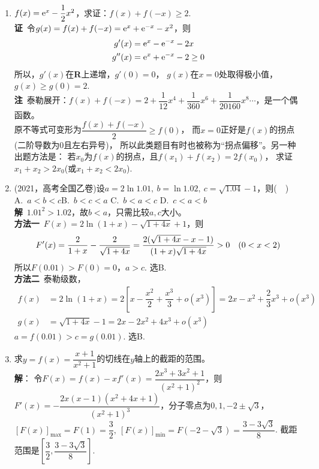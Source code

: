 \begin{enumerate}[label={\textbf{\arabic*.}},leftmargin=
    \inteval{\myenumleftmargin}pt]
\item $ f(x)=\mathrm{e}^x-\dfrac{1}{2}x^2 $，求证：$ f(x)+f(-x)\geq 2 $. \\
\textbf{证}\ 令$ g(x)=f(x)+f(-x)=\mathrm{e}^x+\mathrm{e}^{-x}-x^2 $，则
\begin{align*}
    g'(x) &=\mathrm{e}^x-\mathrm{e}^{-x}-2x \\
    g''(x) &=\mathrm{e}^x+\mathrm{e}^{-x}-2\geq 0 
\end{align*}
所以，$ g'(x) $在\textbf{R}上递增，$ g'(0)=0 $，
$ g(x) $在$ x=0 $处取得极小值，$ g(x)\geq g(0)=2 $. \\
\textbf{注}\ 泰勒展开：$ f(x)+f(-x)=2+\dfrac{1}{12}x^4+\dfrac{1}{360}x^6+
\dfrac{1}{20160}x^8\cdots $，是一个偶函数。\\
原不等式可变形为$ \dfrac{f(x)+f(-x)}{2}\geq f(0) $，
而$ x=0 $正好是$ f(x) $的拐点(二阶导数为0且左右异号)，
所以此类题目有时也被称为“拐点偏移”。另一种出题方法是：
若$ x_0 $为$ f(x) $的拐点，且$ f(x_1)+f(x_2)=2f(x_0) $，
求证$ x_1+x_2>2x_0 $(或$ x_1+x_2< 2x_0 $).

\item (2021，高考全国乙卷)设$a=2\ln1.01,\ b=\ln1.02,\ c=\sqrt{1.04}-1 $，则(\ \ ) \\
A.\ $a<b<c$\q\q B.\ $b<c<a$ \q\q C.\ $b<a<c$ \q\q D.\ $c<a<b$ \\
\textbf{解}\ $1.01^{2}>1.02$，故$b<a$，只需比较$ a,c $大小。\\
\textbf{方法一}\ $ F(x)=2\ln(1+x)-\sqrt{1+4x}+1 $，则
\begin{gather*}
    F'(x)=\dfrac{2}{1+x}-\dfrac{2}{\sqrt{1+4x}}=
    \dfrac{2(\sqrt{1+4x}-x-1)}{(1+x)\sqrt{1+4x}}>0 \quad (0<x<2)
\end{gather*}
所以$ F(0.01)>F(0)=0 $，$ a>c $. 选B. \\
\textbf{方法二}\ 泰勒级数，
\begin{align*}
    f(x) &=2\ln(1+x)=2\left[x-\dfrac{x^{2}}{2}+\dfrac{x^3}{3}+
    o\left(x^{3}\right) \right]=2x-x^2+\dfrac{2}{3}x^3+o(x^3) \\
    g(x) &=\sqrt{1+4x}-1=2x-2x^2+4x^3+o(x^3)
\end{align*}
$ a=f(0.01)>c=g(0.01) $. 选B.

\item 求$ y=f(x)=\dfrac{x+1}{x^2+1} $的切线在$ y $轴上的截距的范围。
\ifteach \\ \textbf{解}：
令$ F(x)=f(x)-xf'(x)=\dfrac{2x^3+3x^2+1}{(x^2+1)^2} $，则
$ F'(x)=-\dfrac{2x(x-1)(x^2+4x+1)}{(x^2+1)^3} $，分子零点为$ 0, 1,
-2\pm \sqrt{3} $，$ [F(x)]_{\max}=F(1)=\dfrac{3}{2},\ 
[F(x)]_{\min}=F(-2-\sqrt{3})=\dfrac{3-3\sqrt{3}}{8} $.
截距范围是$ \left[\dfrac{3}{2},\dfrac{3-3\sqrt{3}}{8}\right] $.
\fi


\end{enumerate}
